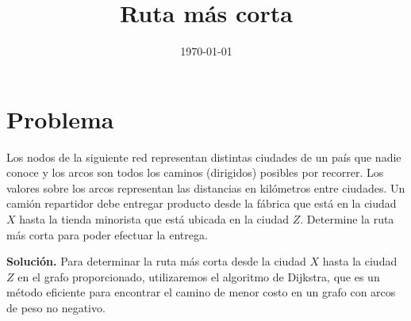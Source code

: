 \documentclass{article}
\begin{document}
\title{Ruta más corta}
\author{}
\date{\today}

\maketitle
\section*{Problema}

Los nodos de la siguiente red representan distintas ciudades de un país que nadie conoce y los arcos son todos los caminos (dirigidos) posibles por recorrer. Los valores sobre los arcos representan las distancias en kilómetros entre ciudades. Un camión repartidor debe entregar producto desde la fábrica que está en la ciudad \( X \) hasta la tienda minorista que está ubicada en la ciudad \( Z \). Determine la ruta más corta para poder efectuar la entrega.

\begin{center}
\end{center}

\textbf{Solución.}
Para determinar la ruta más corta desde la ciudad \( X \) hasta la ciudad \( Z \) en el grafo proporcionado, utilizaremos el algoritmo de Dijkstra, que es un método eficiente para encontrar el camino de menor costo en un grafo con arcos de peso no negativo.
\end{document}
